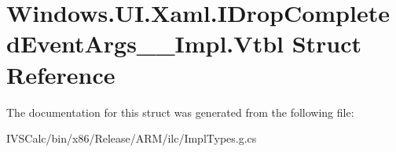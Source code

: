 \hypertarget{struct_windows_1_1_u_i_1_1_xaml_1_1_i_drop_completed_event_args_____impl_1_1_vtbl}{}\section{Windows.\+U\+I.\+Xaml.\+I\+Drop\+Completed\+Event\+Args\+\_\+\+\_\+\+Impl.\+Vtbl Struct Reference}
\label{struct_windows_1_1_u_i_1_1_xaml_1_1_i_drop_completed_event_args_____impl_1_1_vtbl}


The documentation for this struct was generated from the following file\+:\begin{DoxyCompactItemize}
\item 
I\+V\+S\+Calc/bin/x86/\+Release/\+A\+R\+M/ilc/Impl\+Types.\+g.\+cs\end{DoxyCompactItemize}
